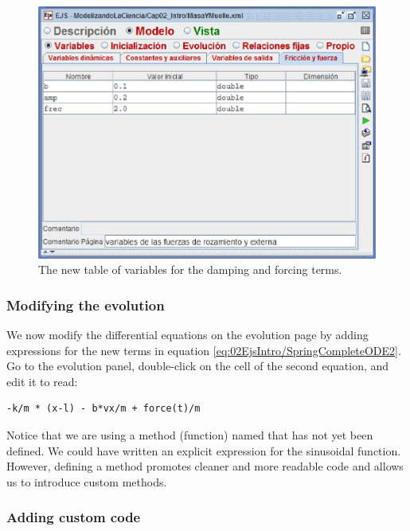 \begin{figure}[htb]
    \centering
  \includegraphics[scale=\scale]{02EjsIntro/images/ModifyVariables2.eps}
    \caption{The new table of variables for the damping and forcing terms.}
    \label{fig:02EjsIntro/ModifyVariables2}
\end{figure}

\subsubsection{Modifying the evolution}

We now modify the differential equations on the evolution page by adding expressions for the new terms in equation
\eqref{eq:02EjsIntro/SpringCompleteODE2}. Go to the evolution panel, double-click on the  cell of the
second equation, and edit it to read:
\begin{listing}
\begin{verbatim}
-k/m * (x-l) - b*vx/m + force(t)/m
\end{verbatim}
\end{listing}
Notice that we are using a method (function) named  that has not yet been defined.
We could have written an explicit expression for the sinusoidal function. However, defining a  method promotes cleaner and more readable code and allows us to introduce custom methods.

\subsubsection{Adding custom code}

